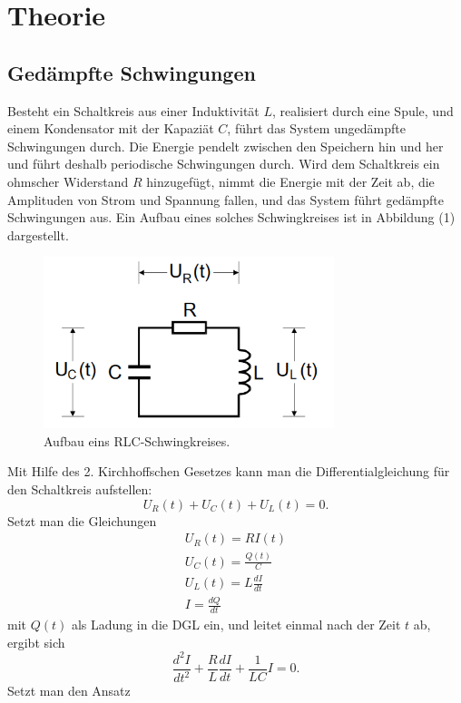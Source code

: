 \section{Theorie}
\label{sec:Theorie}

\subsection {Gedämpfte Schwingungen}
Besteht ein Schaltkreis aus einer Induktivität $L$, realisiert durch eine Spule, und einem Kondensator mit der Kapaziät $C$, führt das System
ungedämpfte Schwingungen durch. Die Energie pendelt zwischen den Speichern hin und her und führt deshalb periodische Schwingungen durch.
Wird dem Schaltkreis ein ohmscher Widerstand $R$ hinzugefügt, nimmt die Energie mit der Zeit ab, die Amplituden von Strom und Spannung fallen,
und das System führt gedämpfte Schwingungen aus. Ein Aufbau eines solches Schwingkreises ist in Abbildung (1) dargestellt. 
\begin{figure}[H]
  \centering
  \includegraphics[height=5cm]{RLC.png}
  \caption{Aufbau eins RLC-Schwingkreises. \cite[S.1]{kent}}
\end{figure}
\noindent Mit Hilfe des 2. Kirchhoffschen Gesetzes kann man die Differentialgleichung für den Schaltkreis aufstellen:
\begin{equation}
U_R (t) + U_C (t) + U_L (t) = 0 .
\end{equation}
Setzt man die Gleichungen
\begin{align}
U_R (t) = R I(t)  \\
U_C (t) = \frac{Q(t)}{C}  \\
U_L (t) = L \frac{dI}{dt} \\
I = \frac{dQ}{dt}
\end{align}
mit $Q(t)$ als Ladung in die DGL ein, und leitet einmal nach der Zeit $t$ ab, ergibt sich 
\begin{equation}
\frac{d^2I}{dt^2} + \frac{R}{L}\frac{dI}{dt} + \frac{1}{LC}I = 0 .
\end{equation}
Setzt man den Ansatz
